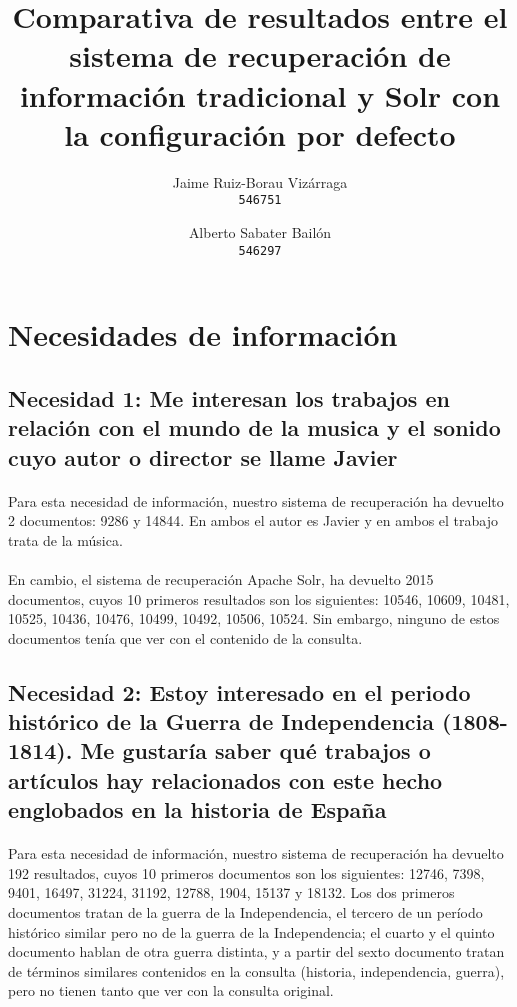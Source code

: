 \documentclass[a4paper]{article}
\begin{document}
\title{Comparativa de resultados entre el sistema de recuperación de información tradicional y Solr con la configuración por defecto}
\author{
	Jaime Ruiz-Borau Vizárraga\\
	\texttt{546751}
	\and
	Alberto Sabater Bailón\\
	\texttt{546297}
	}
\date{}
\maketitle

\section{Necesidades de información}
\subsection{Necesidad 1: Me interesan los trabajos en relación con el mundo de la musica y el sonido cuyo autor o director se llame Javier}
\paragraph{}Para esta necesidad de información, nuestro sistema de recuperación ha devuelto 2 documentos: 9286 y 14844. En ambos el autor es Javier y en ambos el trabajo trata de la música.
\paragraph{}En cambio, el sistema de recuperación Apache Solr, ha devuelto 2015 documentos, cuyos 10 primeros resultados son los siguientes: 10546, 10609, 10481, 10525, 10436, 10476, 10499, 10492, 10506, 10524. Sin embargo, ninguno de estos documentos tenía que ver con el contenido de la consulta.
\subsection{Necesidad 2: Estoy interesado en el periodo histórico de la Guerra de Independencia	(1808-1814). Me gustaría saber qué trabajos o artículos hay relacionados con este hecho englobados en la historia de España}
\paragraph{}Para esta necesidad de información, nuestro sistema de recuperación ha devuelto 192 resultados, cuyos 10 primeros documentos son los siguientes: 12746, 7398, 9401, 16497, 31224, 31192, 12788, 1904, 15137 y 18132. Los dos primeros documentos tratan de la guerra de la Independencia, el tercero de un período histórico similar pero no de la guerra de la Independencia; el cuarto y el quinto documento hablan de otra guerra distinta, y a partir del sexto documento tratan de términos similares contenidos en la consulta (historia, independencia, guerra), pero no tienen tanto que ver con la consulta original. 
\end{document}

